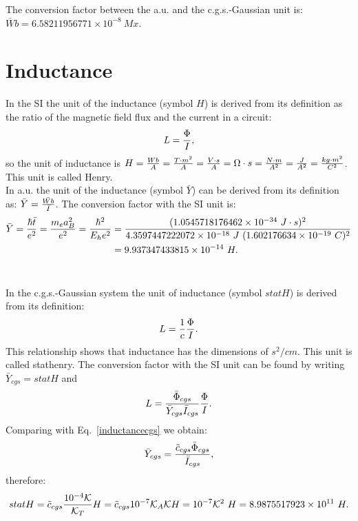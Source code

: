 \documentclass[12pt,a4paper]{article}
\def\hbarf{1.0545718176462\times 10^{-34}}
\def\e{1.602176634\times 10^{-19}}
\def\baru{4.3597447222072\times 10^{-18}}
\def\bary{9.937347433815\times 10^{-14}}
\def\ytoy{8.9875517923\times 10^{11}}
\def\barwbcgs{6.58211956771\times 10^{-8}}
\begin{document}
{\color{green} 
The conversion factor between the a.u. and the c.g.s.-Gaussian unit is: 
$\bar Wb = \barwbcgs\ Mx$.
}



\newpage
\section{\color{coral}Inductance}
In the SI the unit of the inductance (symbol $H$)
is derived from its definition as the ratio of the magnetic
field flux and the current in a circuit:
\begin{equation}
L={\Phi \over I},
\end{equation}
so the unit of inductance is $H={Wb \over A}={T \cdot m^2 \over A}=
{V\cdot s \over A} = \Omega \cdot s= {N \cdot m \over A^2}={J\over A^2}=
{kg\cdot m^2 \over C^2}$. This unit is called Henry. 
\\

{\color{web-blue} In a.u. the unit of the inductance (symbol $\bar Y$) 
can be derived from its definition as:
$\bar Y={\bar {Wb} \over \bar I}$. The conversion factor with the SI unit is:
\begin{align}
\bar Y = {\hbar \bar t\over e^2}={m_e a_B^2 \over e^2}={\hbar^2\over E_h e^2}
&= {(\hbarf\ J\cdot s)^2 \over \baru\ J\ (\e\ C)^2}\nonumber \\
&= \bary\ H.
\end{align}
\\
}

{\color{orange} In the c.g.s.-Gaussian system the unit of inductance
(symbol $statH$) is derived from its definition: 
\begin{equation}
L={1\over c} {\Phi \over I}.
\label{inductancecgs}
\end{equation}
This relationship shows that inductance has the dimensions of 
$s^2/cm$. This unit is called stathenry.
The conversion factor with the SI unit can be found by writing
$\bar Y_{cgs}=statH$ and 
\begin{equation}
L = {\bar \Phi_{cgs} \over \bar Y_{cgs} \bar I_{cgs}} {\Phi \over I}.
\end{equation}
Comparing with Eq.~\ref{inductancecgs} we obtain:
\begin{equation}
\bar Y_{cgs}= {\tilde c_{cgs} \bar \Phi_{cgs} \over \bar I_{cgs}},
\end{equation}
therefore:
\begin{equation}
statH=\tilde c_{cgs} {10^{-4} \mathcal{K} \over \mathcal{K}_T} H =
{\tilde c_{cgs}} {10^{-7} \mathcal{K}_A \mathcal{K}} H=
10^{-7} \mathcal{K}^2\ H = \ytoy\ H.
\end{equation}
\\
}
\end{document}
